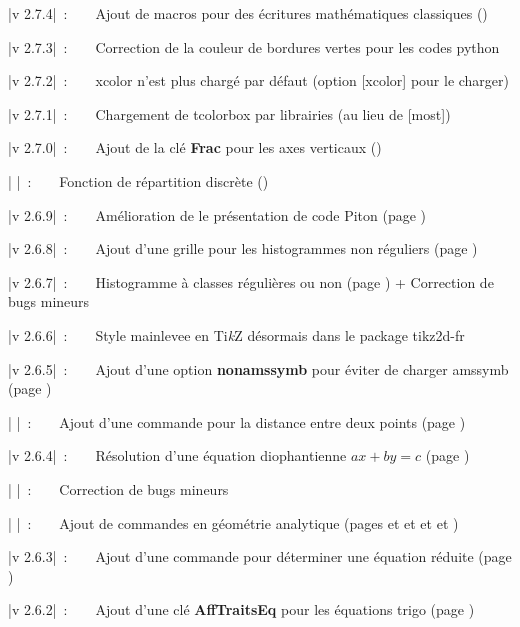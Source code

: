 \documentclass[a4paper,french,11pt]{article}
\providecommand\tikzlogo{Ti\textit{k}Z}
\let\TikZ\tikzlogo
\newcommand\Cle[1]{{\bfseries\sffamily\textlangle \textcolor{orange!75!black}{#1}\textrangle}}
\begin{document}
{\small \bverb|v 2.7.4|~:~~~~Ajout de macros pour des écritures mathématiques classiques (\pageref{ecrituresmath})}

{\small \bverb|v 2.7.3|~:~~~~Correction de la couleur de bordures vertes pour les codes python}

{\small \bverb|v 2.7.2|~:~~~~\textsf{xcolor} n'est plus chargé par défaut (option \textsf{[xcolor]} pour le charger)

{\small \bverb|v 2.7.1|~:~~~~Chargement de \textsf{tcolorbox} par librairies (au lieu de \textsf{[most]})

{\small \bverb|v 2.7.0|~:~~~~Ajout de la clé \Cle{Frac} pour les axes verticaux (\pageref{reperagetikz})

{\small \bverb|       |~:~~~~Fonction de répartition discrète (\pageref{fctrepart})

{\small \bverb|v 2.6.9|~:~~~~Amélioration de le présentation de code \textsf{Piton} (page \pageref{pythonpiton})

{\small \bverb|v 2.6.8|~:~~~~Ajout d'une grille pour les histogrammes non réguliers (page \pageref{histo})

{\small \bverb|v 2.6.7|~:~~~~Histogramme à classes régulières ou non (page \pageref{histo}) + Correction de bugs mineurs

{\small \bverb|v 2.6.6|~:~~~~Style \textsf{mainlevee} en \TikZ{} désormais dans le package \textsf{tikz2d-fr}

{\small \bverb|v 2.6.5|~:~~~~Ajout d'une option \Cle{nonamssymb} pour éviter de charger \textsf{amssymb} (page \pageref{amssymb})

{\small \bverb|       |~:~~~~Ajout d'une commande pour la distance entre deux points (page \pageref{normevect})}

{\small \bverb|v 2.6.4|~:~~~~Résolution d'une équation diophantienne $ax+by=c$ (page \pageref{eqdioph})

{\small \bverb|       |~:~~~~Correction de bugs mineurs

{\small \bverb|       |~:~~~~Ajout de commandes en géométrie analytique (pages \pageref{affcoord} et \pageref{eqcartplan} et \pageref{eqparamdroite} et \pageref{eqcartdroite} et \pageref{distptplan})

{\small \bverb|v 2.6.3|~:~~~~Ajout d'une commande pour déterminer une équation réduite (page \pageref{eqreduite})

{\small \bverb|v 2.6.2|~:~~~~Ajout d'une clé \Cle{AffTraitsEq} pour les équations trigo (page \pageref{cercletrigo})

}}}}}}}}}}}}}}
\end{document}
